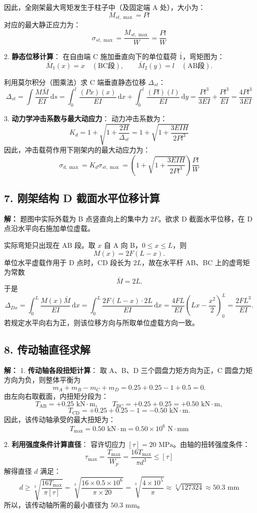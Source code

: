 \documentclass[11pt,a4paper]{ctexrep}
\newcommand{\diff}{\,\mathrm{d}}
\begin{document}
{因此，全刚架最大弯矩发生于柱子中（及固定端 A 处），大小为：
\[
M_{st,\max} = P l
\]
对应的最大静正应力为：
\[
\sigma_{st,\max} = \frac{M_{st,\max}}{W} = \frac{P l}{W}
\]

2. \textbf{静态位移计算}：
在自由端 C 施加垂直向下的单位载荷 $\bar{1}$，弯矩图为：
\[
\bar{M}_1(x)=x\quad(\text{BC段}),\qquad
\bar{M}_2(y)=l\quad(\text{AB段}).
\]

利用莫尔积分（图乘法）求 C 端垂直静态位移 $\Delta_{st}$：
\[
\Delta_{st} = \int \frac{M \bar{M}}{EI} \diff s = \int_0^l \frac{(Px)(x)}{EI} \diff x + \int_0^l \frac{(Pl)(l)}{EI} \diff y = \frac{P l^3}{3 EI} + \frac{P l^3}{EI} = \frac{4 P l^3}{3 EI}
\]

3. \textbf{动力学冲击系数与最大动应力}：
动力冲击系数为：
\[
K_d = 1 + \sqrt{1 + \frac{2H}{\Delta_{st}}} = 1 + \sqrt{1 + \frac{3 E I H}{2 P l^3}}
\]
因此，冲击载荷作用下刚架内的最大动应力为：
\[
\sigma_{d,\max} = K_d \sigma_{st,\max} = \left( 1 + \sqrt{1 + \frac{3 E I H}{2 P l^3}} \right) \frac{P l}{W}
\]

\subsection*{7. 刚架结构 D 截面水平位移计算}
\textbf{解：}
题图中实际外载为 B 点竖直向上的集中力 $2F$。欲求 D 截面水平位移，在 D 点沿水平向右施加单位虚载。

实际弯矩只出现在 AB 段。取 $x$ 自 A 向 B，$0\le x\le L$，则
\[
M(x)=2F(L-x).
\]
单位水平虚载作用于 D 点时，CD 段长为 $2L$，故在水平杆 AB、BC 上的虚弯矩为常数
\[
\bar M=2L.
\]
于是
\[
\Delta_{Dx}
=\int_0^L\frac{M(x)\bar M}{EI}\diff x
=\int_0^L\frac{2F(L-x)\cdot 2L}{EI}\diff x
=\frac{4FL}{EI}\left(Lx-\frac{x^2}{2}\right)_0^L
=\frac{2FL^3}{EI}.
\]
若规定水平向右为正，则该位移方向与所取单位虚载方向一致。

\subsection*{8. 传动轴直径求解}
\textbf{解：}
1. \textbf{传动轴各段扭矩计算}：
取 A、B、D 三个圆盘力矩方向为正，C 圆盘力矩方向为负，则整体平衡为
\[
m_A+m_B-m_C+m_D=0.25+0.25-1+0.5=0.
\]
由左向右取截面，内扭矩分段为：
\[
T_{\mathrm{AB}} = +0.25\text{ kN}\cdot\text{m},
\qquad
T_{\mathrm{BC}} = +0.25+0.25=+0.50\text{ kN}\cdot\text{m},
\]
\[
T_{\mathrm{CD}} = +0.25+0.25-1=-0.50\text{ kN}\cdot\text{m}.
\]
因此，该传动轴承受的最大扭矩为：
\[
T_{\max} = 0.50\text{ kN}\cdot\text{m} = 0.50 \times 10^6\text{ N}\cdot\text{mm}
\]

2. \textbf{利用强度条件计算直径}：
容许切应力 $[\tau] = 20\text{ MPa}$。由轴的扭转强度条件：
\[
\tau_{\max} = \frac{T_{\max}}{W_p} = \frac{16 T_{\max}}{\pi d^3} \le [\tau]
\]
解得直径 $d$ 满足：
\[
d \ge \sqrt[3]{\frac{16 T_{\max}}{\pi [\tau]}} = \sqrt[3]{\frac{16 \times 0.5 \times 10^6}{\pi \times 20}} = \sqrt[3]{\frac{4 \times 10^5}{\pi}} \approx \sqrt[3]{127324} \approx 50.3\text{ mm}
\]
所以，该传动轴所需的最小直径为 $50.3\text{ mm}$。


}
\end{document}
